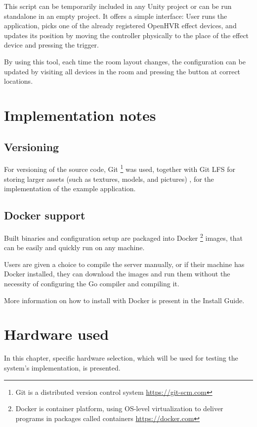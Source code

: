 This script can be temporarily included in any Unity project or can be run
standalone in an empty project. It offers a simple interface:
User runs the application, picks one of the already registered OpenHVR
effect devices, and updates its position by moving the controller physically
to the place of the effect device and pressing the trigger.


By using this tool, each time the room layout changes, the configuration can
be updated by visiting all devices in the room and pressing the button at
correct locations.


\hypertarget{x-implementation-notes}{\section{Implementation notes}}
\hypertarget{x-versioning}{\subsection{Versioning}}
For versioning of the source code, Git
\footnote{Git is a distributed version control system \href{https://git-scm.com}{https://git-scm.com}}
was used, together with Git LFS for
storing larger assets (such as textures, models, and pictures)
, for the implementation of the example application.


\hypertarget{x-docker-support}{\subsection{Docker support}}
Built binaries and configuration setup are packaged into Docker
\footnote{Docker is container platform, using OS-level virtualization to deliver programs in packages called containers \href{https://docker.com}{https://docker.com}}
images, that can be easily and quickly run on any machine.


Users are given a choice to compile the server manually, or if their machine has
Docker installed, they can download the images and run them without
the necessity of configuring the Go compiler and compiling it.

More information on how to install with Docker is present in the Install Guide.

\hypertarget{x-hardware-used}{\section{Hardware used}}
In this chapter, specific hardware selection, which will be used for testing the
system’s implementation, is presented.


